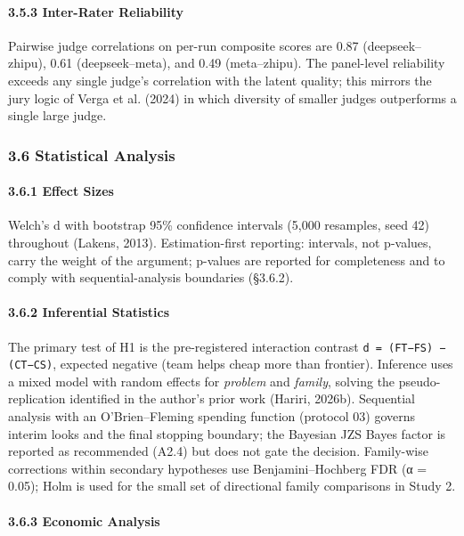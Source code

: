 \documentclass[11pt,a4paper]{article}
\begin{document}
\paragraph{3.5.3 Inter-Rater Reliability}

Pairwise judge correlations on per-run composite scores are 0.87
(deepseek–zhipu), 0.61 (deepseek–meta), and 0.49 (meta–zhipu). The
panel-level reliability exceeds any single judge's correlation with
the latent quality; this mirrors the jury logic of Verga et al.
(2024) in which diversity of smaller judges outperforms a single
large judge.

\subsubsection{3.6 Statistical Analysis}

\paragraph{3.6.1 Effect Sizes}

Welch's d with bootstrap 95\% confidence intervals (5,000 resamples,
seed 42) throughout (Lakens, 2013). Estimation-first reporting:
intervals, not p-values, carry the weight of the argument; p-values
are reported for completeness and to comply with sequential-analysis
boundaries (§3.6.2).

\paragraph{3.6.2 Inferential Statistics}

The primary test of H1 is the pre-registered interaction contrast
\texttt{d = (FT−FS) − (CT−CS)}, expected negative (team helps cheap more than
frontier). Inference uses a mixed model with random effects for
\textit{problem} and \textit{family}, solving the pseudo-replication identified in
the author's prior work (Hariri, 2026b). Sequential analysis with an
O'Brien–Fleming spending function (protocol 03) governs interim looks
and the final stopping boundary; the Bayesian JZS Bayes factor is
reported as recommended (A2.4) but does not gate the decision.
Family-wise corrections within secondary hypotheses use
Benjamini–Hochberg FDR (α = 0.05); Holm is used for the small set of
directional family comparisons in Study 2.

\paragraph{3.6.3 Economic Analysis}
\end{document}
